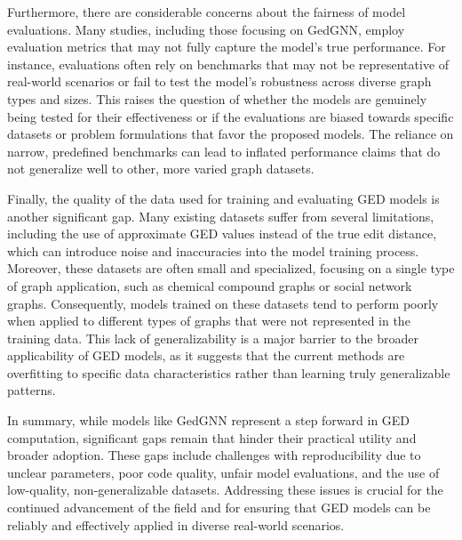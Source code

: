 \documentclass[../Thesis.tex]{subfiles}
\begin{document}
	Furthermore, there are considerable concerns about the fairness of model evaluations. Many studies, including those focusing on GedGNN, employ evaluation metrics that may not fully capture the model's true performance. For instance, evaluations often rely on benchmarks that may not be representative of real-world scenarios or fail to test the model's robustness across diverse graph types and sizes. This raises the question of whether the models are genuinely being tested for their effectiveness or if the evaluations are biased towards specific datasets or problem formulations that favor the proposed models. The reliance on narrow, predefined benchmarks can lead to inflated performance claims that do not generalize well to other, more varied graph datasets.
	
	Finally, the quality of the data used for training and evaluating GED models is another significant gap. Many existing datasets suffer from several limitations, including the use of approximate GED values instead of the true edit distance, which can introduce noise and inaccuracies into the model training process. Moreover, these datasets are often small and specialized, focusing on a single type of graph application, such as chemical compound graphs or social network graphs. Consequently, models trained on these datasets tend to perform poorly when applied to different types of graphs that were not represented in the training data. This lack of generalizability is a major barrier to the broader applicability of GED models, as it suggests that the current methods are overfitting to specific data characteristics rather than learning truly generalizable patterns.
	
	In summary, while models like GedGNN represent a step forward in GED computation, significant gaps remain that hinder their practical utility and broader adoption. These gaps include challenges with reproducibility due to unclear parameters, poor code quality, unfair model evaluations, and the use of low-quality, non-generalizable datasets. Addressing these issues is crucial for the continued advancement of the field and for ensuring that GED models can be reliably and effectively applied in diverse real-world scenarios.

	
\end{document}
